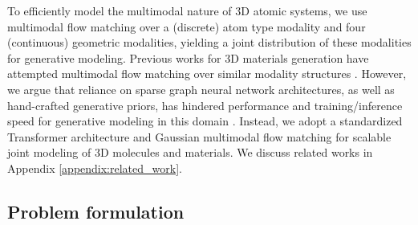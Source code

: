 \documentclass{article}
\theoremstyle{plain}
\theoremstyle{definition}
\theoremstyle{remark}
\begin{document}
To efficiently model the multimodal nature of 3D atomic systems, we use multimodal flow matching over a (discrete) atom type modality and four (continuous) geometric modalities, yielding a joint distribution of these modalities for generative modeling. 
Previous works for 3D materials generation have attempted multimodal flow matching over similar modality structures \citep{miller2024flowmm}. However, we argue that reliance on sparse graph neural network architectures, as well as hand-crafted generative priors, has hindered performance and training/inference speed for generative modeling in this domain \citep{krishnapriyan2021characterizing, qu2024escaip}. Instead, we adopt a standardized Transformer architecture and Gaussian multimodal flow matching for scalable joint modeling of 3D molecules and materials. We discuss related works in Appendix \ref{appendix:related_work}.

\subsection{Problem formulation}
\label{subsection:problem_formulation}
\end{document}
